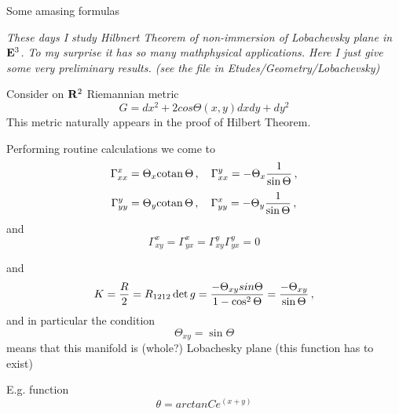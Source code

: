 



\baselineskip=14pt
\def\vare {\varepsilon}
\def\A {{\bf A}}
\def\t {\tilde}
\def\a {\alpha}
\def\K {{\bf K}}
\def\N {{\bf N}}
\def\V {{\cal V}}
\def\s {{\sigma}}
\def\S {{\Sigma}}
\def\s {{\sigma}}
\def\p{\partial}
\def\vare{{\varepsilon}}
\def\Q {{\bf Q}}
\def\D {{\cal D}}
\def\G {{\Gamma}}
\def\C {{\bf C}}
\def\M {{\cal M}}
\def\Z {{\bf Z}}
\def\U  {{\cal U}}
\def\H {{\cal H}}
\def\R  {{\bf R}}
\def\S  {{\bf S}}
\def\E  {{\bf E}}
\def\l {\lambda}
\def\ll {{\bf l}}
\def\degree {{\bf {\rm degree}\,\,}}
\def \finish {${\,\,\vrule height1mm depth2mm width 8pt}$}
\def \m {\medskip}
\def\p {\partial}
\def\r {{\bf r}}
\def\pt {{\bf p}}
\def\v {{\bf v}}
\def\n {{\bf n}}
\def\t {{\bf t}}
\def\b {{\bf b}}
\def\c {{\bf c }}
\def\e{{\bf e}}
\def\ac {{\bf a}}
\def \X   {{\bf X}}
\def \Y   {{\bf Y}}
\def \x   {{\bf x}}
\def \y   {{\bf y}}
\def \G{{\cal G}}



\centerline {Some amasing formulas}

 {\it These  days I study Hilbnert Theorem of non-immersion of Lobachevsky plane  in $\E^3$. To my surprise it has so many mathphysical applications.
   Here I just give some very preliminary results. (see the file in 
Etudes/Geometry/Lobachevsky)}

Consider on $\R^2$  Riemannian metric
                  $$
    G=dx^2+2cos\Theta(x,y)dxdy+dy^2
                  $$
This metric naturally appears in the proof of Hilbert Theorem.



   Performing  routine  calculations we come to
                       $$
\Gamma_{xx}^x=\Theta_x{\rm cotan\,}\Theta\,,\quad 
\Gamma_{xx}^y=-\Theta_x{1\over \sin \Theta}\,,
                       $$
                       $$
\Gamma_{yy}^y=\Theta_y{\rm cotan\,}\Theta\,,\quad 
\Gamma_{yy}^x=-\Theta_y{1\over \sin \Theta}\,,
                       $$
and
               $$
\Gamma^x_{xy}=
\Gamma^x_{yx}=
\Gamma^y_{xy}
\Gamma^y_{yx}=0
               $$

and  
                $$
   K={R\over 2}={R_{1212}\det g}={-\Theta_{xy}sin\Theta\over 1-\cos^2\Theta}=
              {-\Theta_{xy}\over \sin \Theta}\,,
                $$
and in particular
         the condition
                   $$
           \Theta_{xy}=\sin \Theta
                   $$
means that this manifold is (whole?)  Lobachesky plane
  (this function has to exist)

E.g. function
                $$
     \theta={arctan }Ce^(x+y)
                $$
\bye

